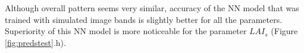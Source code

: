 \documentclass[a4paper, twoside]{templates/ociamthesis}
\begin{document}
Although overall pattern seems very similar, accuracy of the NN model that was trained with simulated image bands is slightly better for all the parameters. Superiority of this NN model is more noticeable for the parameter \(LAI_{s}\) (Figure \ref{fig:predstest}.h).






\end{document}
